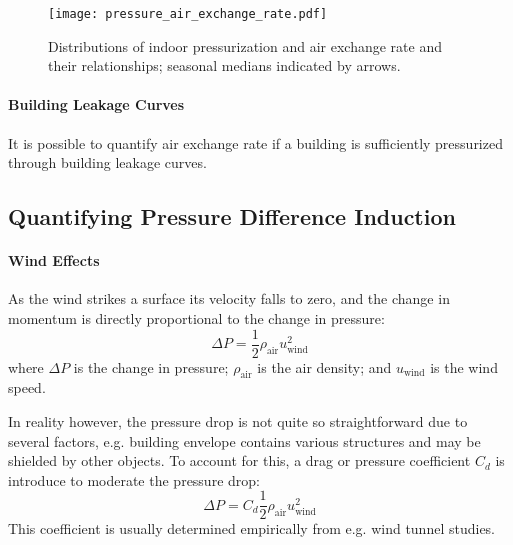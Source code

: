 \begin{figure}[htb!]
  \texttt{[image: pressure\_air\_exchange\_rate.pdf]}
  \caption{Distributions of indoor pressurization and air exchange rate and their relationships; seasonal medians indicated by arrows.}
  \label{fig:pressure_air_exchange_rate_kde}
\end{figure}

\paragraph{Building Leakage Curves}

It is possible to quantify air exchange rate if a building is sufficiently pressurized through building leakage curves.

\subsection{Quantifying Pressure Difference Induction}\label{sec:quantifying_pressure}


\paragraph{Wind Effects}

As the wind strikes a surface its velocity falls to zero, and the change in momentum is directly proportional to the change in pressure:
\begin{equation}\label{eq:wind_pressure_uncorrected}
  \Delta P = \frac{1}{2} \rho_\mathrm{air} u_\mathrm{wind}^2
\end{equation}
where $\Delta P$ is the change in pressure; $\rho_\mathrm{air}$ is the air density; and $u_\mathrm{wind}$ is the wind speed.\par

In reality however, the pressure drop is not quite so straightforward due to several factors, e.g. building envelope contains various structures and may be shielded by other objects.
To account for this, a drag or pressure coefficient $C_d$ is introduce to moderate the pressure drop:
\begin{equation}\label{eq:wind_pressure}
  \Delta P = C_d \frac{1}{2} \rho_\mathrm{air} u_\mathrm{wind}^2
\end{equation}
This coefficient is usually determined empirically from e.g. wind tunnel studies.

